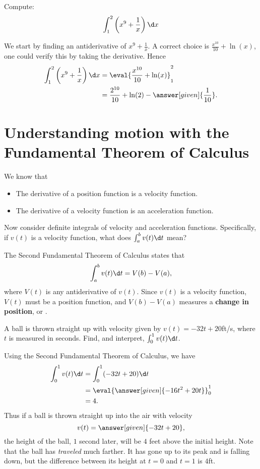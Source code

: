 \documentclass{ximera}
\begin{document}
\begin{example}
Compute:
\[
\int_1^2\left(x^9 + \frac{1}{x}\right) \d x
\]
\begin{explanation}
We start by finding an antiderivative of $x^9 + \frac{1}{x}$.  A
correct choice is $\frac{x^{10}}{10} + \ln(x)$, one could verify this
by taking the derivative. Hence
\begin{align*}
\int_1^2\left(x^9 + \frac{1}{x}\right) \d x &= \eval{\frac{x^{10}}{10} + \ln(x)}_1^2 \\
&= \frac{2^{10}}{10} + \ln(2) - \answer[given]{\frac{1}{10}}.
\end{align*}
\end{explanation}
\end{example}




\section{Understanding motion with the Fundamental Theorem of Calculus}

We know that
\begin{itemize}
\item The derivative of a position function is a velocity function.
\item The derivative of a velocity function is an acceleration
  function.
\end{itemize}
Now consider definite integrals of velocity and acceleration
functions. Specifically, if $v(t)$ is a velocity function, what does
$\int_a^b v(t)\d t$ mean?

The Second Fundamental Theorem of Calculus states that
\[
\int_a^b v(t)\d t = V(b) - V(a),
\]
where $V(t)$ is any antiderivative of $v(t)$. Since $v(t)$ is a
velocity function, $V(t)$ must be a position function, and $V(b) -
V(a)$ measures a \textbf{change in position}, or .

\begin{example}
  A ball is thrown straight up with velocity given by $v(t) =
  -32t+20$ft/s, where $t$ is measured in seconds. Find, and interpret,
  $\int_0^1 v(t)\d t$.
    \begin{explanation}
      Using the Second Fundamental Theorem of Calculus, we have
      \begin{align*}
        \int_0^1 v(t)\d t &= \int_0^1 (-32t+20)\d t \\
	&= \eval{\answer[given]{-16t^2 + 20t}}_0^1 \\
	&= 4.
      \end{align*}
      Thus if a ball is thrown straight up into the air with velocity
      \[
      v(t) = \answer[given]{-32t+20},
      \]
      the height of the ball, $1$ second later, will be $4$ feet above the
      initial height. Note that the ball has \textit{traveled} much
      farther. It has gone up to its peak and is falling down, but the
      difference between its height at $t=0$ and $t=1$ is $4$ft. 
    \end{explanation}
\end{example}    
\end{document}
